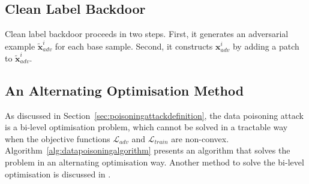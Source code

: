 \subsection*{Clean Label Backdoor} Clean label backdoor proceeds in two steps. First, it generates an adversarial example $\tilde{\textbf{x}}_{adv}^{i}$ for each base sample. Second, it constructs ${\textbf{x}}_{adv}^{i}$ by adding a patch to $\tilde{\textbf{x}}_{adv}^{i}$. 


\subsection{An Alternating Optimisation Method}

As discussed in Section~\ref{sec:poisoningattackdefinition}, the data poisoning attack is a bi-level optimisation problem, which cannot be solved in a tractable way when the objective functions $\mathcal{L}_{adv}$ and $\mathcal{L}_{train}$ are non-convex. Algorithm~\ref{alg:datapoisoningalgorithm} presents an algorithm that solves the problem in an alternating optimisation way. Another method to solve the bi-level optimisation is discussed in \cite{236234}. 

